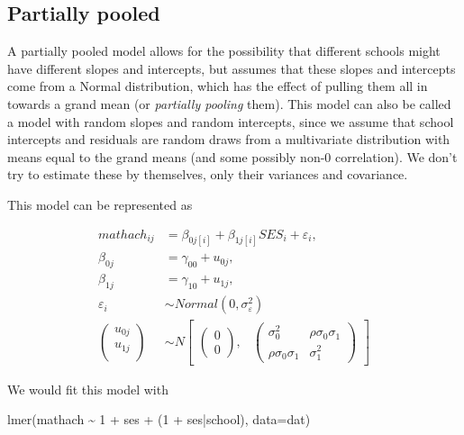 \documentclass[
  letterpaper,
  DIV=11,
  numbers=noendperiod]{scrreprt}
\newenvironment{Shaded}{}{}
\newcommand{\AttributeTok}[1]{\textcolor[rgb]{0.49,0.56,0.16}{#1}}
\newcommand{\DecValTok}[1]{\textcolor[rgb]{0.25,0.63,0.44}{#1}}
\newcommand{\FunctionTok}[1]{\textcolor[rgb]{0.02,0.16,0.49}{#1}}
\newcommand{\NormalTok}[1]{#1}
\newcommand{\SpecialCharTok}[1]{\textcolor[rgb]{0.25,0.44,0.63}{#1}}
\begin{document}
\subsection{Partially pooled}\label{partially-pooled}

A partially pooled model allows for the possibility that different
schools might have different slopes and intercepts, but assumes that
these slopes and intercepts come from a Normal distribution, which has
the effect of pulling them all in towards a grand mean (or
\emph{partially pooling} them). This model can also be called a model
with random slopes and random intercepts, since we assume that school
intercepts and residuals are random draws from a multivariate
distribution with means equal to the grand means (and some possibly
non-0 correlation). We don't try to estimate these by themselves, only
their variances and covariance.

This model can be represented as

\[\begin{aligned}
mathach_{ij} &= \beta_{0j[i]} + \beta_{1j[i]}SES_i + \varepsilon_i, \\
    \beta_{0j} &= \gamma_{00} + u_{0j},\\
    \beta_{1j} &= \gamma_{10} + u_{1j},\\
    \varepsilon_i &\sim Normal(0, \sigma^2_\varepsilon) \\
    \begin{pmatrix}
        u_{0j}\\
        u_{1j}\\
    \end{pmatrix} &\sim  N
    \begin{bmatrix}
        \begin{pmatrix}
            0\\
            0
        \end{pmatrix}\!\!,&
        \begin{pmatrix}
            \sigma^2_0 & \rho\sigma_0\sigma_1\\
            \rho\sigma_0\sigma_1 & \sigma^2_1
        \end{pmatrix}
    \end{bmatrix}
\end{aligned}\]

We would fit this model with

\begin{Shaded}
\begin{Highlighting}[]
\FunctionTok{lmer}\NormalTok{(mathach }\SpecialCharTok{\textasciitilde{}} \DecValTok{1} \SpecialCharTok{+}\NormalTok{ ses }\SpecialCharTok{+}\NormalTok{ (}\DecValTok{1} \SpecialCharTok{+}\NormalTok{ ses}\SpecialCharTok{|}\NormalTok{school), }\AttributeTok{data=}\NormalTok{dat)}
\end{Highlighting}
\end{Shaded}
\end{document}
